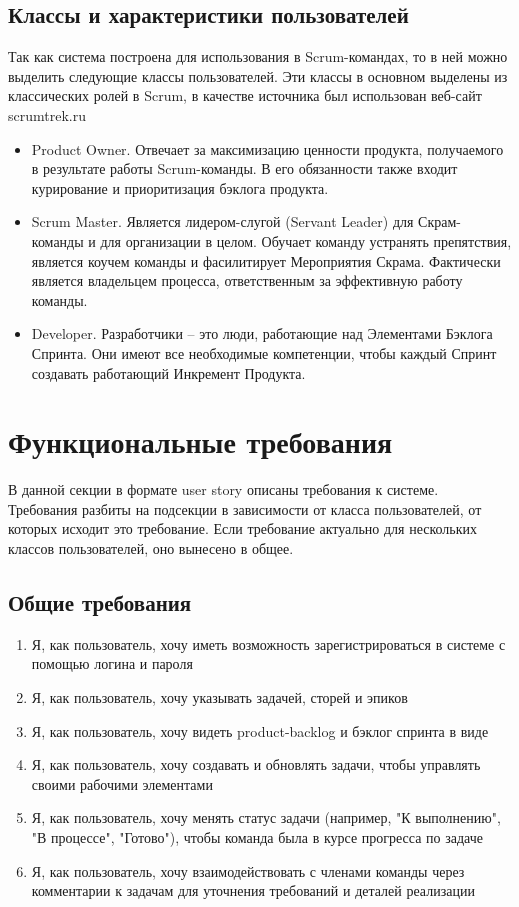 \documentclass{article}
\begin{document}
\subsection{Классы и характеристики пользователей}
Так как система построена для использования в Scrum-командах, то в ней
можно выделить следующие классы пользователей. Эти классы в основном выделены из
классических ролей в Scrum, в качестве источника был использован веб-сайт scrumtrek.ru
\begin{itemize}
\item Product Owner. Отвечает за максимизацию ценности продукта, получаемого в результате работы Scrum-команды.
В его обязанности также входит курирование и приоритизация бэклога продукта.
\item Scrum Master. Является лидером-слугой (Servant Leader) для Скрам-команды и для организации в целом.
Обучает команду устранять препятствия, является коучем команды и фасилитирует Мероприятия Скрама.
Фактически является владельцем процесса, ответственным за эффективную работу команды.
\item Developer. Разработчики -- это люди, работающие над Элементами Бэклога Спринта.
Они имеют все необходимые компетенции, чтобы каждый Спринт создавать работающий Инкремент Продукта.
\end{itemize}

\section{Функциональные требования}

В данной секции в формате user story описаны требования к системе.
Требования разбиты на подсекции в зависимости от класса пользователей,
от которых исходит это требование.
Если требование актуально для нескольких классов пользователей, оно
вынесено в общее.

\subsection{Общие требования}
\begin{enumerate}[label=\textbf{FR\arabic*}.]
  \item Я, как пользователь, хочу иметь возможность зарегистрироваться в системе с помощью логина и пароля
  \item Я, как пользователь, хочу указывать  задачей, сторей и эпиков
  \item Я, как пользователь, хочу видеть \Gls{product-backlog} и бэклог спринта в виде 
  \item Я, как пользователь, хочу создавать и обновлять задачи, чтобы управлять своими рабочими элементами
  \item Я, как пользователь, хочу менять статус задачи (например, "К выполнению", "В процессе", "Готово"), чтобы команда была в курсе прогресса по задаче
  \item Я, как пользователь, хочу взаимодействовать с членами команды через комментарии к задачам для уточнения требований и деталей реализации
\end{enumerate}
\end{document}
